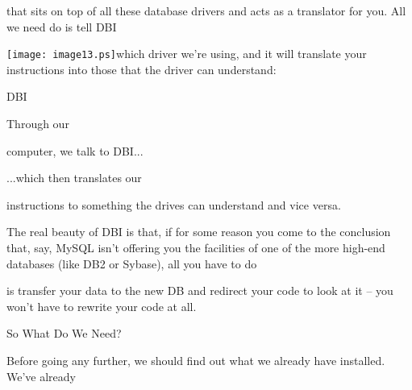 \documentclass[a4paper,11pt]{book}
\begin{document}
\noindent that sits on top of all these database drivers and acts as a translator for you. All we need do is tell DBI

\noindent \texttt{[image: image13.ps]}which driver we're using, and it will translate your instructions into those that the driver can understand:

\noindent 

\noindent 

\noindent 

\noindent 

\noindent 

\noindent 

\noindent 

\noindent 

\noindent 

\noindent 

\noindent 

\noindent 

\noindent 

\noindent 

\noindent DBI

\noindent 

\noindent 

\noindent Through our

\noindent computer, we talk to DBI...

\noindent 

\noindent 

\noindent 

\noindent ...which then translates our

\noindent instructions to something the drives can understand and vice  versa.

\noindent 

\noindent 

\noindent 

\noindent The real beauty of DBI is that, if for some reason you come to the conclusion that, say, MySQL isn't offering you the facilities of one of the more high-end databases (like DB2 or Sybase), all you have to do

\noindent is transfer your data to the new DB and redirect your code to look at it -- you won't have to rewrite your code at all.

\noindent 

\noindent So What Do We Need?

\noindent 

\noindent Before going any further,  we  should  find  out what  we  already  have  installed.  We've  already
\end{document}
